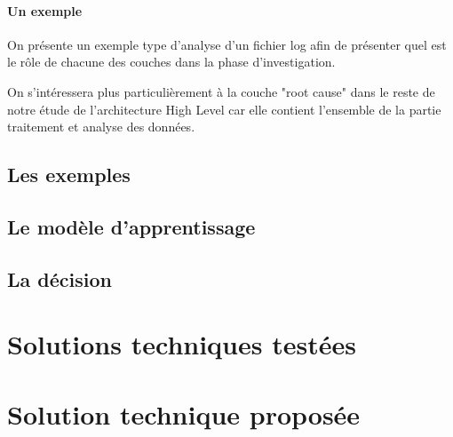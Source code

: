 \paragraph{Un exemple} On présente un exemple type d'analyse d'un fichier log afin de présenter quel est le rôle de chacune des couches dans la phase d'investigation.

On s'intéressera plus particulièrement à la couche "root cause" dans le reste de notre étude de l'architecture High Level car elle contient l'ensemble de la partie traitement et analyse des données.

\subsection{Les exemples}
\label{Automatisation du processus d'investigation: Achitecture High Level du système proposé: Les exemples}

\subsection{Le modèle d'apprentissage}
\label{Automatisation du processus d'investigation: Achitecture High Level du système proposé: Le modèle d'apprentissage}

\subsection{La décision}
\label{Automatisation du processus d'investigation: Achitecture High Level du système proposé: La décision}



\section{Solutions techniques testées}
\label{Automatisation du processus d'investigation: Solutions techniques testées}




\section{Solution technique proposée}
\label{Automatisation du processus d'investigation: Solution technique proposée}

